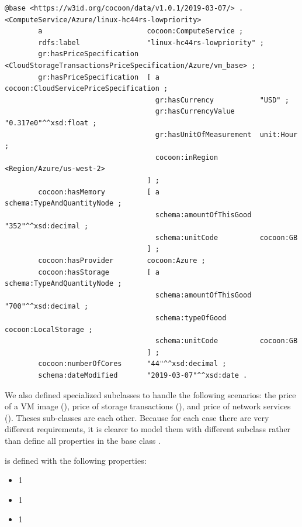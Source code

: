 \begin{lstlisting}[caption={Price Specification for Compute service from Azure},label={lst:PriceSpecification}]
@base <https://w3id.org/cocoon/data/v1.0.1/2019-03-07/> .
<ComputeService/Azure/linux-hc44rs-lowpriority>
        a                         cocoon:ComputeService ;
        rdfs:label                "linux-hc44rs-lowpriority" ;
        gr:hasPriceSpecification  <CloudStorageTransactionsPriceSpecification/Azure/vm_base> ;
        gr:hasPriceSpecification  [ a                        cocoon:CloudServicePriceSpecification ;
                                    gr:hasCurrency           "USD" ;
                                    gr:hasCurrencyValue      "0.317e0"^^xsd:float ;
                                    gr:hasUnitOfMeasurement  unit:Hour ;
                                    cocoon:inRegion          <Region/Azure/us-west-2>
                                  ] ;
        cocoon:hasMemory          [ a                        schema:TypeAndQuantityNode ;
                                    schema:amountOfThisGood  "352"^^xsd:decimal ;
                                    schema:unitCode          cocoon:GB
                                  ] ;
        cocoon:hasProvider        cocoon:Azure ;
        cocoon:hasStorage         [ a                        schema:TypeAndQuantityNode ;
                                    schema:amountOfThisGood  "700"^^xsd:decimal ;
                                    schema:typeOfGood        cocoon:LocalStorage ;
                                    schema:unitCode          cocoon:GB
                                  ] ;
        cocoon:numberOfCores      "44"^^xsd:decimal ;
        schema:dateModified       "2019-03-07"^^xsd:date .
\end{lstlisting}

We also defined specialized subclasses to handle the following scenarios:
the price of a VM image (),
price of storage transactions (),
and price of network services ().
Theses sub-classes are  each other.
Because for each case there are very different requirements, it is clearer
to model them with different subclass rather than define all properties in the base class
.

 is defined with the following properties:
\begin{itemize}
  \item[]   1 
  \item[]   1 
  \item[]   1 
\end{itemize}

